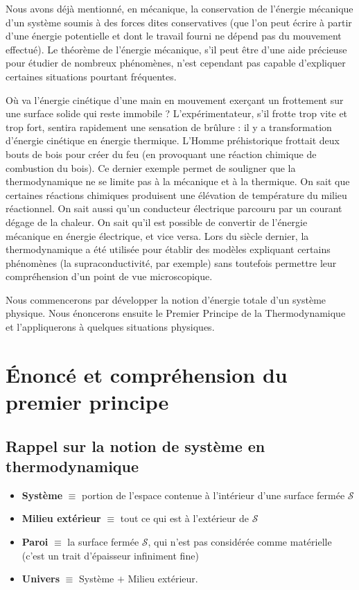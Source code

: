 \documentclass[11pt,a4paper]{report}
\begin{document}
Nous avons déjà mentionné, en mécanique, la conservation de l'énergie mécanique d'un système soumis à des forces dites conservatives (que l'on peut écrire à partir d'une énergie potentielle et dont le travail fourni ne dépend pas du mouvement effectué). Le théorème de l'énergie mécanique, s'il peut être d'une aide précieuse pour étudier de nombreux phénomènes, n'est cependant pas capable d'expliquer certaines situations pourtant fréquentes.

Où va l'énergie cinétique d'une main en mouvement exerçant un frottement sur une surface solide qui reste immobile ? L'expérimentateur, s'il frotte trop vite et trop fort, sentira rapidement une sensation de brûlure : il y a transformation d'énergie cinétique en énergie thermique. L'Homme préhistorique frottait deux bouts de bois pour créer du feu (en provoquant une réaction chimique de combustion du bois). Ce dernier exemple permet de souligner que la thermodynamique ne se limite pas à la mécanique et à la thermique. On sait que certaines réactions chimiques produisent une élévation de température du milieu réactionnel. On sait aussi qu'un conducteur électrique parcouru par un courant dégage de la chaleur. On sait qu'il est possible de convertir de l'énergie mécanique en énergie électrique, et vice versa. Lors du siècle dernier, la thermodynamique a été utilisée pour établir des modèles expliquant certains phénomènes (la supraconductivité, par exemple) sans toutefois permettre leur compréhension d'un point de vue microscopique.

Nous commencerons par développer la notion d'énergie totale d'un système physique. Nous énoncerons ensuite le Premier Principe de la Thermodynamique et l'appliquerons à quelques situations physiques.



\newpage
\section{\'Enoncé et compréhension du premier principe}

\subsection{Rappel sur la notion de système en thermodynamique}

\begin{itemize}
	\item \textbf{Système} $\equiv$ portion de l'espace contenue à l'intérieur d'une surface fermée $\mathcal{S}$
	\item \textbf{Milieu extérieur} $\equiv$ tout ce qui est à l'extérieur de $\mathcal{S}$
	\item \textbf{Paroi} $\equiv$ la surface fermée $\mathcal{S}$, qui n'est pas considérée comme matérielle (c'est un trait d'épaisseur infiniment fine)
	\item \textbf{Univers} $\equiv$ Système $+$ Milieu extérieur.\\
\end{itemize}
\end{document}
